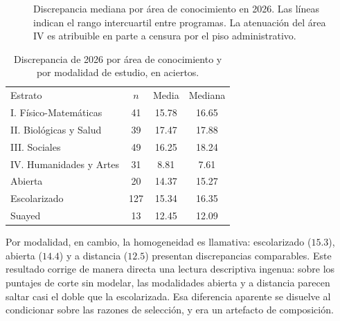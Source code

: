 \documentclass[aps,prd,reprint,amsmath,amssymb,nofootinbib,superscriptaddress]{revtex4-2}
\begin{document}
\begin{figure}[t]
\centering
{}
\caption{Discrepancia mediana por \'area de conocimiento en 2026. Las
l\'ineas indican el rango intercuartil entre programas. La atenuaci\'on
del \'area IV es atribuible en parte a censura por el piso
administrativo.}
\label{fig:het}
\end{figure}

\begin{table}[t]
\caption{Discrepancia de 2026 por \'area de conocimiento y por modalidad
de estudio, en aciertos.}
\label{tab:het}
\begin{ruledtabular}
\begin{tabular}{lccc}
Estrato & $n$ & Media & Mediana \\ \colrule
I. F\'isico-Matem\'aticas & 41 & 15.78 & 16.65 \\
II. Biol\'ogicas y Salud & 39 & 17.47 & 17.88 \\
III. Sociales & 49 & 16.25 & 18.24 \\
IV. Humanidades y Artes & 31 & 8.81 & 7.61 \\
\colrule
Abierta & 20 & 14.37 & 15.27 \\
Escolarizado & 127 & 15.34 & 16.35 \\
Suayed & 13 & 12.45 & 12.09 \\
\end{tabular}
\end{ruledtabular}
\end{table}

Por modalidad, en cambio, la homogeneidad es llamativa: escolarizado
($15.3$), abierta ($14.4$) y a distancia ($12.5$) presentan
discrepancias comparables. Este resultado corrige de manera directa una
lectura descriptiva ingenua: sobre los puntajes de corte sin modelar, las
modalidades abierta y a distancia parecen saltar casi el doble que la
escolarizada. Esa diferencia aparente se disuelve al condicionar sobre las
razones de selecci\'on, y era un artefacto de composici\'on.
\end{document}
